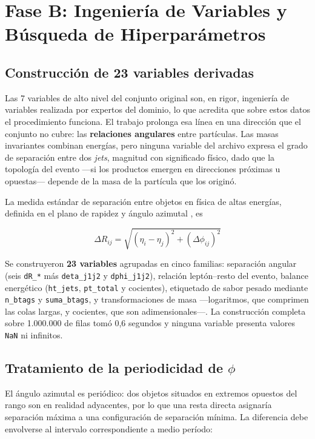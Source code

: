 \documentclass[12pt,a4paper]{article}
\begin{document}
\section{Fase B: Ingeniería de Variables y Búsqueda de Hiperparámetros}

\subsection{Construcción de 23 variables derivadas}

Las 7 variables de alto nivel del conjunto original son, en rigor, ingeniería de variables
realizada por expertos del dominio, lo que acredita que sobre estos datos el procedimiento
funciona. El trabajo prolonga esa línea en una dirección que el conjunto no cubre: las
\textbf{relaciones angulares} entre partículas. Las masas invariantes combinan energías, pero
ninguna variable del archivo expresa el grado de separación entre dos \emph{jets}, magnitud con
significado físico, dado que la topología del evento ---si los productos emergen en direcciones
próximas u opuestas--- depende de la masa de la partícula que los originó.

La medida estándar de separación entre objetos en física de altas energías, definida en el plano
de rapidez y ángulo azimutal \citep{antikt}, es

\begin{equation}
\Delta R_{ij} = \sqrt{(\eta_i - \eta_j)^2 + (\Delta\phi_{ij})^2}
\label{eq:deltar}
\end{equation}

Se construyeron \textbf{23 variables} agrupadas en cinco familias: separación angular (seis
\texttt{dR\_*} más \texttt{deta\_j1j2} y \texttt{dphi\_j1j2}), relación leptón--resto del evento,
balance energético (\texttt{ht\_jets}, \texttt{pt\_total} y cocientes), etiquetado de sabor pesado
\citep{cms2018} mediante \texttt{n\_btags} y \texttt{suma\_btags}, y transformaciones de masa
---logaritmos, que comprimen las colas largas, y cocientes, que son adimensionales---. La
construcción completa sobre 1.000.000 de filas tomó 0,6 segundos y ninguna variable presenta
valores \texttt{NaN} ni infinitos.

\subsection{Tratamiento de la periodicidad de \texorpdfstring{$\phi$}{phi}}

El ángulo azimutal es periódico: dos objetos situados en extremos opuestos del rango son en
realidad adyacentes, por lo que una resta directa asignaría separación máxima a una configuración
de separación mínima. La diferencia debe envolverse al intervalo correspondiente a medio período:
\end{document}
